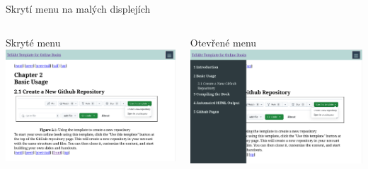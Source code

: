\begin{frame}{Skrytí menu na malých displejích}
 \begin{columns}
    \begin{column}{0.48\textwidth}
      \begin{block}{Skryté menu}
      \includegraphics[width=\linewidth]{img/book-hamburger.png}
    \end{block}
    \end{column}
    \begin{column}{0.48\textwidth}
      \begin{block}{Otevřené menu}
      \includegraphics[width=\linewidth]{img/book-hamburger-open.png}
    \end{block}
    \end{column}
  \end{columns}
\end{frame}

